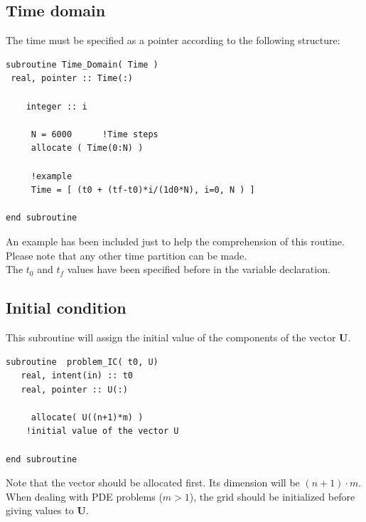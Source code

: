 \newpage



\subsection{Time domain}

The time must be specified as a pointer according to the following structure: \\

\begin{blueframed}
\begin{lstlisting}
subroutine Time_Domain( Time ) 
 real, pointer :: Time(:) 
 
    integer :: i 
    
     N = 6000      !Time steps 
     allocate ( Time(0:N) ) 

     !example
     Time = [ (t0 + (tf-t0)*i/(1d0*N), i=0, N ) ]  
 
end subroutine 

\end{lstlisting}

\end{blueframed}

An example has been included just to help the comprehension of this routine.
Please note that any other time partition can be made.\\

The $t_0$ and $t_f$ values have been specified  before in the variable
declaration.\\

\subsection{Initial condition}

This subroutine will assign the initial value of the components of the vector
$\mathbf{U}$.\\

\begin{blueframed}
\begin{lstlisting}
subroutine  problem_IC( t0, U)
   real, intent(in) :: t0 
   real, pointer :: U(:)

	 allocate( U((n+1)*m) )
	!initial value of the vector U 
	
end subroutine 
\end{lstlisting}

\end{blueframed}

Note that the vector should be allocated first. Its dimension will be
$(n+1)\cdot m$. When dealing with PDE problems ($m > 1$), the grid should be
initialized before giving values to $\mathbf{U}$.\\

